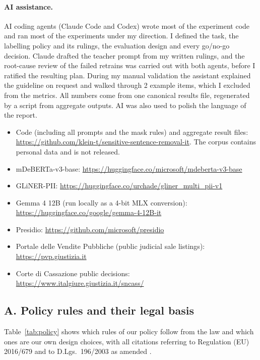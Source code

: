 \documentclass[11pt]{article}
\begin{document}
\paragraph{AI assistance.} AI coding agents (Claude Code and Codex) wrote most of the experiment code and ran most of the experiments under my direction. I defined the task, the labelling policy and its rulings, the evaluation design and every go/no-go decision. Claude drafted the teacher prompt from my written rulings, and the root-cause review of the failed retrains was carried out with both agents, before I ratified the resulting plan. During my manual validation the assistant explained the guideline on request and walked through 2 example items, which I excluded from the metrics. All numbers come from one canonical results file, regenerated by a script from aggregate outputs. AI was also used to polish the language of the report.



\externallinks

\begin{itemize}\itemsep0pt
\item Code (including all prompts and the mask rules) and aggregate result files: \url{https://github.com/klein-t/sensitive-sentence-removal-it}. The corpus contains personal data and is not released.
\item mDeBERTa-v3-base: \url{https://huggingface.co/microsoft/mdeberta-v3-base}
\item GLiNER-PII: \url{https://huggingface.co/urchade/gliner_multi_pii-v1}
\item Gemma 4 12B (run locally as a 4-bit MLX conversion): \url{https://huggingface.co/google/gemma-4-12B-it}
\item Presidio: \url{https://github.com/microsoft/presidio}
\item Portale delle Vendite Pubbliche (public judicial sale listings): \url{https://pvp.giustizia.it}
\item Corte di Cassazione public decisions: \url{https://www.italgiure.giustizia.it/sncass/}
\end{itemize}

\myappendix

\subsection*{A. Policy rules and their legal basis}
Table~\ref{tab:policy} shows which rules of our policy follow from the law and which ones are our own design choices, with all citations referring to Regulation (EU) 2016/679 \citep{gdpr} and to D.Lgs.~196/2003 as amended \citep{codiceprivacy}.
\end{document}
